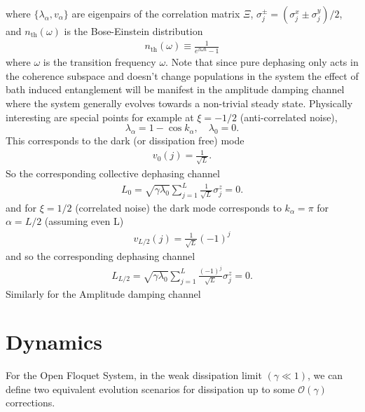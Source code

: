 \documentclass[aps,pra,reprint,amsmath,amssymb]{revtex4-2}
\begin{document}
where $\{\lambda_\alpha,v_\alpha\}$ are eigenpairs of the correlation matrix $\Xi$, $\sigma_j^{\pm}=(\sigma^x_j \pm \sigma^y_j)/2$, and $n_{\text{th}}(\omega)$ is the Bose-Einstein distribution
\begin{align}
    n_{\text{th}}(\omega) \equiv \frac{1}{e^{\beta\omega\hbar} -1}
\end{align}
where $\omega$ is the transition frequency $\omega$. Note that since pure dephasing only acts in the coherence subspace and doesn't change populations in the system the effect of bath induced entanglement will be manifest in the amplitude damping channel where the system generally evolves towards a non-trivial steady state. Physically interesting are special points for example at $\xi=-1/2$ (anti-correlated noise), $$\lambda_\alpha=1-\cos{k_\alpha},\quad \lambda_0=0.$$ This corresponds to the dark (or dissipation free) mode
\begin{align*}
    v_0 (j)=\frac{1}{\sqrt{L}}.
\end{align*}
So the corresponding collective dephasing channel \begin{align*}
    L_0 = \sqrt{\gamma \lambda_0} \sum_{j=1}^L\frac{1}{\sqrt{L}}\sigma^z_j = 0.
\end{align*}
and for $\xi=1/2$ (correlated noise) the dark mode corresponds to $k_\alpha=\pi$ for $\alpha=L/2$ (assuming even L)
\begin{align*}
    v_{L/2}(j)= \frac{1}{\sqrt{L}}(-1)^j
\end{align*}
and so the corresponding dephasing channel
\begin{align*}
    L_{L/2} = \sqrt{\gamma \lambda_0} \sum_{j=1}^L\frac{(-1)^j}{\sqrt{L}}\sigma^z_j = 0.
\end{align*}
Similarly for the Amplitude damping channel
\section{Dynamics}
For the Open Floquet System, in the weak dissipation limit $(\gamma \ll 1)$, we can define two equivalent evolution scenarios for dissipation up to some $\mathcal{O}(\gamma)$ corrections.
\end{document}
